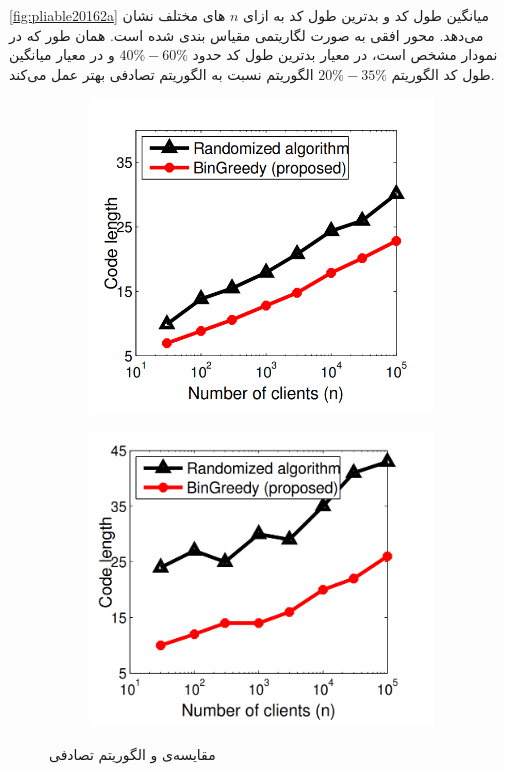 \autoref{fig:pliable20162a}
میانگین طول کد و بدترین طول کد به ازای
$n$
های مختلف نشان می‌دهد. محور افقی به صورت لگاریتمی مقیاس بندی شده است. همان طور که در نمودار مشخص است، در معیار بدترین طول کد حدود
$40\%-60\%$
و در معیار میانگین طول کد الگوریتم
$20\%-35\%$
الگوریتم
نسبت به الگوریتم تصادفی بهتر عمل می‌کند.
\begin{figure}
    \centering
    \begin{subfigure}[b]{0.45\textwidth}
        \centering
        \includegraphics[width=1\linewidth]{figs/ch3/pliable2016_2a}
        \caption{}
        \label{fig:pliable20162a}
    \end{subfigure}
    \hfill
    \begin{subfigure}[b]{0.45\textwidth}
        \centering
        \includegraphics[width=1\linewidth]{figs/ch3/pliable2016_2b}
        \caption{
        }
        \label{fig:pliable20162b}
    \end{subfigure}
    \caption{
        مقایسه‌ی
        و الگوریتم تصادفی
    }
\end{figure}

